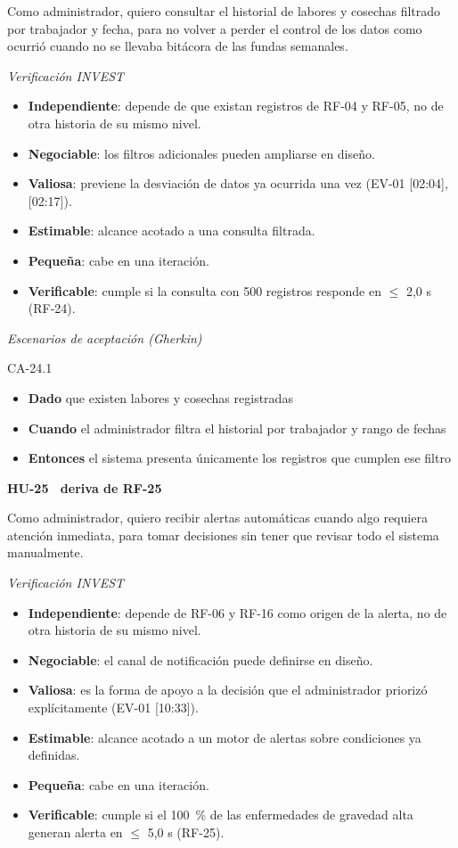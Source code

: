 \documentclass[12pt,a4paper]{article}
\begin{document}
\smallskip
\noindent Como administrador, quiero consultar el historial de labores y cosechas filtrado por trabajador y fecha, para no volver a perder el control de los datos como ocurrió cuando no se llevaba bitácora de las fundas semanales.

\smallskip
\noindent\textit{Verificación INVEST}
\begin{itemize}
\item \textbf{Independiente}: depende de que existan registros de RF-04 y RF-05, no de otra historia de su mismo nivel.
\item \textbf{Negociable}: los filtros adicionales pueden ampliarse en diseño.
\item \textbf{Valiosa}: previene la desviación de datos ya ocurrida una vez (EV-01 [02:04], [02:17]).
\item \textbf{Estimable}: alcance acotado a una consulta filtrada.
\item \textbf{Pequeña}: cabe en una iteración.
\item \textbf{Verificable}: cumple si la consulta con 500 registros responde en $\leq$ 2,0 s (RF-24).
\end{itemize}

\smallskip
\noindent\textit{Escenarios de aceptación (Gherkin)}

\noindent CA-24.1
\begin{itemize}
\item[] \textbf{Dado} que existen labores y cosechas registradas
\item[] \textbf{Cuando} el administrador filtra el historial por trabajador y rango de fechas
\item[] \textbf{Entonces} el sistema presenta únicamente los registros que cumplen ese filtro
\end{itemize}

\bigskip
\noindent\textbf{HU-25 \textperiodcentered\ deriva de RF-25}

\smallskip
\noindent Como administrador, quiero recibir alertas automáticas cuando algo requiera atención inmediata, para tomar decisiones sin tener que revisar todo el sistema manualmente.

\smallskip
\noindent\textit{Verificación INVEST}
\begin{itemize}
\item \textbf{Independiente}: depende de RF-06 y RF-16 como origen de la alerta, no de otra historia de su mismo nivel.
\item \textbf{Negociable}: el canal de notificación puede definirse en diseño.
\item \textbf{Valiosa}: es la forma de apoyo a la decisión que el administrador priorizó explícitamente (EV-01 [10:33]).
\item \textbf{Estimable}: alcance acotado a un motor de alertas sobre condiciones ya definidas.
\item \textbf{Pequeña}: cabe en una iteración.
\item \textbf{Verificable}: cumple si el 100~\% de las enfermedades de gravedad alta generan alerta en $\leq$ 5,0 s (RF-25).
\end{itemize}
\end{document}
